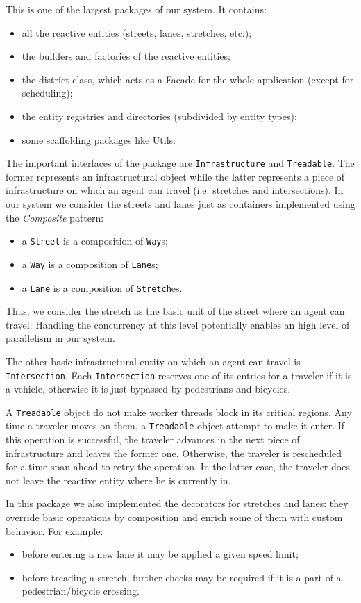 This is one of the largest packages of our system.
It contains:
\begin{itemize}
	\item all the reactive entities (streets, lanes, stretches, etc.);
	\item the builders and factories of the reactive entities;
	\item the district class, which acts as a Facade for
the whole application (except for scheduling);
	\item the entity registries and directories (subdivided by entity types);
	\item some scaffolding packages like Utils.
\end{itemize}

The important interfaces of the package are \texttt{Infrastructure} and
\texttt{Treadable}. The former represents an infrastructural object while the
latter represents a piece of infrastructure on which an agent can travel
(i.e. stretches and intersections).
In our system we consider the streets and lanes just as containers
implemented using the \textit{Composite} pattern:
\begin{itemize}
	\item a \texttt{Street} is a composition of \texttt{Way}s;
	\item a \texttt{Way} is a composition of \texttt{Lane}s;
	\item a  \texttt{Lane} is a composition of \texttt{Stretch}es.
\end{itemize}

Thus, we consider the stretch as the basic unit
of the street where an agent can travel.
Handling the concurrency at this level potentially enables
an high level of  parallelism in our system.

The other basic infrastructural entity on which an agent can travel is
\texttt{Intersection}. Each \texttt{Intersection} reserves one of its
entries for a traveler if it is a vehicle, otherwise it is just bypassed by
pedestrians and bicycles.

A \texttt{Treadable} object do not make worker threads block in its
critical regions.
Any time a traveler moves on them, a \texttt{Treadable} object attempt
to make it enter. If this
operation is successful, the traveler advances in the next piece of
infrastructure
and leaves the former one. Otherwise, the traveler is rescheduled
for a time span ahead
to retry the operation. In the latter case, the traveler does not leave
the reactive entity where he is currently in.

In this package we also implemented the decorators for stretches and lanes: they
override basic operations by composition and enrich some of them with custom
behavior. For example:

\begin{itemize}
  \item before entering a new lane it may be applied a given speed limit;
  \item before treading a stretch, further checks may be required if it is a
    part of a pedestrian/bicycle crossing.
 \end{itemize}

